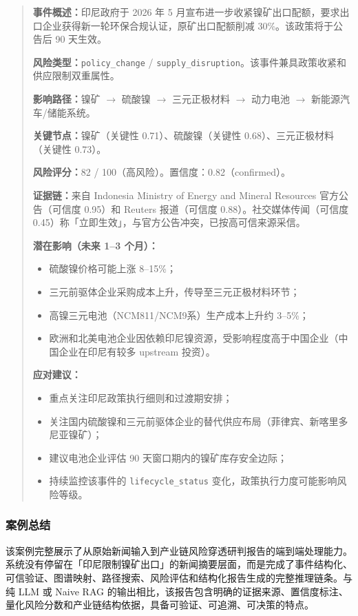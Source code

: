 \begin{quote}
\textbf{事件概述：}印尼政府于 2026 年 5 月宣布进一步收紧镍矿出口配额，要求出口企业获得新一轮环保合规认证，原矿出口配额削减 30\%。该政策将于公告后 90 天生效。

\textbf{风险类型：}\texttt{policy\_change} / \texttt{supply\_disruption}。该事件兼具政策收紧和供应限制双重属性。

\textbf{影响路径：}镍矿 $\to$ 硫酸镍 $\to$ 三元正极材料 $\to$ 动力电池 $\to$ 新能源汽车/储能系统。

\textbf{关键节点：}镍矿（关键性 0.71）、硫酸镍（关键性 0.68）、三元正极材料（关键性 0.73）。

\textbf{风险评分：}82 / 100（高风险）。置信度：0.82（confirmed）。

\textbf{证据链：}来自 Indonesia Ministry of Energy and Mineral Resources 官方公告（可信度 0.95）和 Reuters 报道（可信度 0.88）。社交媒体传闻（可信度 0.45）称「立即生效」，与官方公告冲突，已按高可信来源采信。

\textbf{潜在影响（未来 1--3 个月）：}
\begin{itemize}
    \item 硫酸镍价格可能上涨 8--15\%；
    \item 三元前驱体企业采购成本上升，传导至三元正极材料环节；
    \item 高镍三元电池（NCM811/NCM9系）生产成本上升约 3--5\%；
    \item 欧洲和北美电池企业因依赖印尼镍资源，受影响程度高于中国企业（中国企业在印尼有较多 upstream 投资）。
\end{itemize}

\textbf{应对建议：}
\begin{itemize}
    \item 重点关注印尼政策执行细则和过渡期安排；
    \item 关注国内硫酸镍和三元前驱体企业的替代供应布局（菲律宾、新喀里多尼亚镍矿）；
    \item 建议电池企业评估 90 天窗口期内的镍矿库存安全边际；
    \item 持续监控该事件的 \texttt{lifecycle\_status} 变化，政策执行力度可能影响风险等级。
\end{itemize}
\end{quote}

\subsubsection{案例总结}

该案例完整展示了\projectshort 从原始新闻输入到产业链风险穿透研判报告的端到端处理能力。系统没有停留在「印尼限制镍矿出口」的新闻摘要层面，而是完成了事件结构化、可信验证、图谱映射、路径搜索、风险评估和结构化报告生成的完整推理链条。与纯 LLM 或 Naive RAG 的输出相比，该报告包含明确的证据来源、置信度标注、量化风险分数和产业链结构依据，具备可验证、可追溯、可决策的特点。

